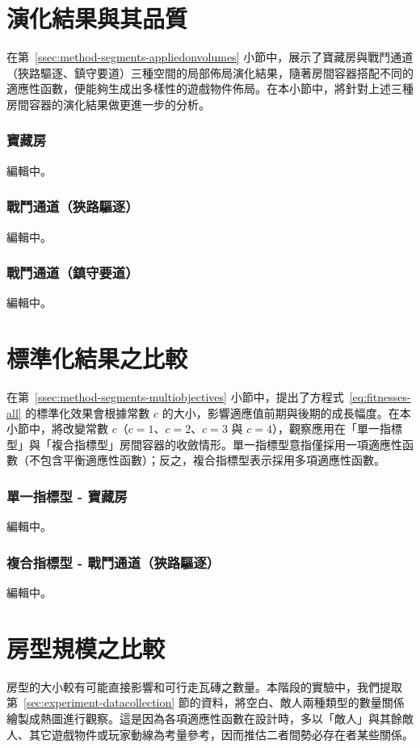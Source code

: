 \section{演化結果與其品質}
\label{sec:experiment-results}

在第~\ref{ssec:method-segments-appliedonvolumes} 小節中，展示了寶藏房與戰鬥通道（狹路驅逐、鎮守要道）三種空間的局部佈局演化結果，隨著房間容器搭配不同的適應性函數，便能夠生成出多樣性的遊戲物件佈局。在本小節中，將針對上述三種房間容器的演化結果做更進一步的分析。

\subsubsection{寶藏房}
\label{sssec:experiment-results-treasure}

編輯中。

\subsubsection{戰鬥通道（狹路驅逐）}
\label{sssec:experiment-results-narrow}

編輯中。

\subsubsection{戰鬥通道（鎮守要道）}
\label{sssec:experiment-results-trunk}

編輯中。

\section{標準化結果之比較}
\label{sec:experiment-normalized}

在第~\ref{ssec:method-segments-multiobjectives} 小節中，提出了方程式~\ref{eq:fitnesses-all} 的標準化效果會根據常數 $c$ 的大小，影響適應值前期與後期的成長幅度。在本小節中，將改變常數 $c$（$c = 1$、$c = 2$、$c = 3$ 與 $c = 4$），觀察應用在「單一指標型」與「複合指標型」房間容器的收斂情形。單一指標型意指僅採用一項適應性函數（不包含平衡適應性函數）；反之，複合指標型表示採用多項適應性函數。

\subsubsection{單一指標型 - 寶藏房}
\label{sssec:experiment-normalized-treasure}

編輯中。

\subsubsection{複合指標型 - 戰鬥通道（狹路驅逐）}
\label{sssec:experiment-normalized-narrow}

編輯中。

\section{房型規模之比較}
\label{sec:experiment-density}

房型的大小較有可能直接影響和可行走瓦磚之數量。本階段的實驗中，我們提取第~\ref{sec:experiment-datacollection} 節的資料，將空白、敵人兩種類型的數量關係繪製成熱圖進行觀察。這是因為各項適應性函數在設計時，多以「敵人」與其餘敵人、其它遊戲物件或玩家動線為考量參考，因而推估二者間勢必存在者某些關係。

